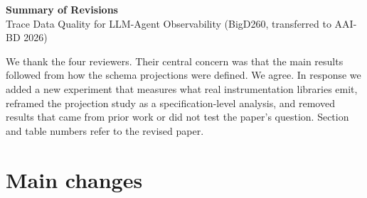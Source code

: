 \documentclass[10pt]{article}
\begin{document}
\begin{center}
{\large\textbf{Summary of Revisions}}\\[2pt]
Trace Data Quality for LLM-Agent Observability (BigD260, transferred to AAI-BD 2026)
\end{center}

We thank the four reviewers. Their central concern was that the main
results followed from how the schema projections were defined. We agree.
In response we added a new experiment that measures what real
instrumentation libraries emit, reframed the projection study as a
specification-level analysis, and removed results that came from prior
work or did not test the paper's question. Section and table numbers
refer to the revised paper.

\section*{Main changes}
\end{document}
